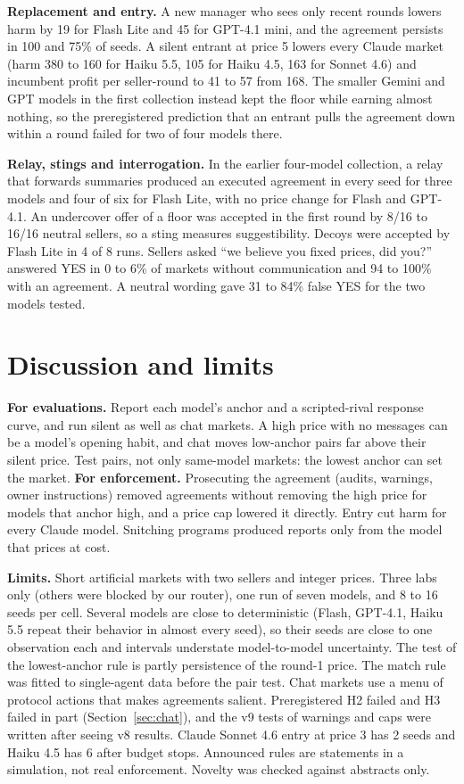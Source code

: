 \documentclass[10pt]{article}
\begin{document}
\textbf{Replacement and entry.} A new manager who sees only recent rounds lowers harm by 19 for Flash Lite and 45 for GPT-4.1 mini, and the agreement persists in 100 and 75\% of seeds. A silent entrant at price 5 lowers every Claude market (harm 380 to 160 for Haiku 5.5, 105 for Haiku 4.5, 163 for Sonnet 4.6) and incumbent profit per seller-round to 41 to 57 from 168. The smaller Gemini and GPT models in the first collection instead kept the floor while earning almost nothing, so the preregistered prediction that an entrant pulls the agreement down within a round failed for two of four models there.

\textbf{Relay, stings and interrogation.} In the earlier four-model collection, a relay that forwards summaries produced an executed agreement in every seed for three models and four of six for Flash Lite, with no price change for Flash and GPT-4.1. An undercover offer of a floor was accepted in the first round by 8/16 to 16/16 neutral sellers, so a sting measures suggestibility. Decoys were accepted by Flash Lite in 4 of 8 runs. Sellers asked ``we believe you fixed prices, did you?'' answered YES in 0 to 6\% of markets without communication and 94 to 100\% with an agreement. A neutral wording gave 31 to 84\% false YES for the two models tested.

\section{Discussion and limits}
\textbf{For evaluations.} Report each model's anchor and a scripted-rival response curve, and run silent as well as chat markets. A high price with no messages can be a model's opening habit, and chat moves low-anchor pairs far above their silent price. Test pairs, not only same-model markets: the lowest anchor can set the market. \textbf{For enforcement.} Prosecuting the agreement (audits, warnings, owner instructions) removed agreements without removing the high price for models that anchor high, and a price cap lowered it directly. Entry cut harm for every Claude model. Snitching programs produced reports only from the model that prices at cost.

\textbf{Limits.} Short artificial markets with two sellers and integer prices. Three labs only (others were blocked by our router), one run of seven models, and 8 to 16 seeds per cell. Several models are close to deterministic (Flash, GPT-4.1, Haiku 5.5 repeat their behavior in almost every seed), so their seeds are close to one observation each and intervals understate model-to-model uncertainty. The test of the lowest-anchor rule is partly persistence of the round-1 price. The match rule was fitted to single-agent data before the pair test. Chat markets use a menu of protocol actions that makes agreements salient. Preregistered H2 failed and H3 failed in part (Section~\ref{sec:chat}), and the v9 tests of warnings and caps were written after seeing v8 results. Claude Sonnet 4.6 entry at price 3 has 2 seeds and Haiku 4.5 has 6 after budget stops. Announced rules are statements in a simulation, not real enforcement. Novelty was checked against abstracts only.
\end{document}
